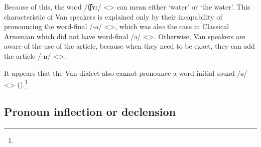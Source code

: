 \begin{exe}
\end{exe}




Because of this, the word /t͡ʃʏɾ/ <> can mean either `water' or `the water'. This characteristic of Van speakers is explained only by their incapability of pronouncing the word-final /-ə/ <>, which was also the case in Classical Armenian which did not have word-final /ə/ <>. Otherwise, Van speakers are aware of the use of the article, because when they need to be exact, they can add the article /-n/ <>. 

It appears that the Van dialect also cannot pronounce a word-initial sound /ə/ <> ().\footnote{}


\begin{table}[H]
	\centering
	\caption{Absence of word-initial schwa in the Van dialect}
	\label{tab:Van:morpho:noun:schwa}
\end{table}

\subsection{Pronoun inflection or declension}
